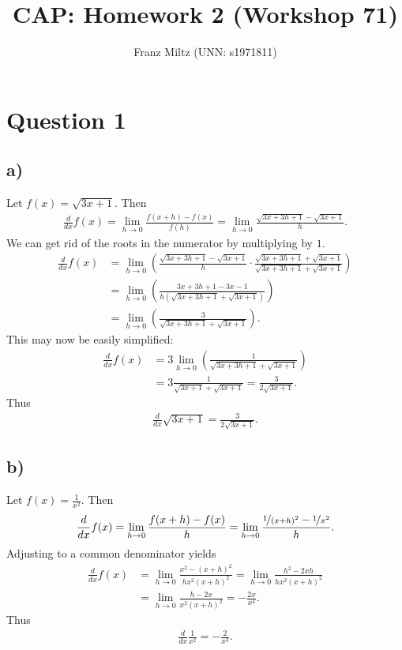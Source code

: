 \documentclass{article}
\title{CAP: Homework 2 (Workshop 71)}
\author{Franz Miltz (UNN: s1971811)}
\begin{document}
\maketitle
\section*{Question 1}
\subsection*{a)}
Let $f(x)=\sqrt{3x+1}$. Then
\begin{align*}
  \frac{d}{dx}f(x)=\lim_{h\to0}\frac{f(x+h)-f(x)}{f(h)}
  =\lim_{h\to0}\frac{\sqrt{3x+3h+1}-\sqrt{3x+1}}{h}.
\end{align*}
We can get rid of the roots in the numerator by multiplying by $1$.
\begin{align*}
  \frac{d}{dx}f(x) & =\lim_{h\to0}\left(\frac{\sqrt{3x+3h+1}-\sqrt{3x+1}}{h}\cdot\frac{\sqrt{3x+3h+1}+\sqrt{3x+1}}{\sqrt{3x+3h+1}+\sqrt{3x+1}}\right) \\
                   & =\lim_{h\to0}\left(\frac{3x+3h+1-3x-1}{h(\sqrt{3x+3h+1}+\sqrt{3x+1})}\right)                                                     \\
                   & =\lim_{h\to0}\left(\frac{3}{\sqrt{3x+3h+1}+\sqrt{3x+1}}\right).
\end{align*}
This may now be easily simplified:
\begin{align*}
  \frac{d}{dx}f(x) & = 3\lim_{h\to0}\left(\frac{1}{\sqrt{3x+3h+1}+\sqrt{3x+1}}\right) \\
                   & =3\frac{1}{\sqrt{3x+1}+\sqrt{3x+1}}=\frac{3}{2\sqrt{3x+1}}.
\end{align*}
Thus
\begin{align*}
  \frac{d}{dx}\sqrt{3x+1}=\frac{3}{2\sqrt{3x+1}}.
\end{align*}
\subsection*{b)}
Let $f(x)=\frac{1}{x^2}$. Then
\begin{align*}
  \frac{d}{dx}f(x)=\lim_{h\to0}\frac{f(x+h)-f(x)}{h}=\lim_{h\to0}\frac{\nicefrac{1}{(x+h)^2}-\nicefrac{1}{x^2}}{h}.
\end{align*}
Adjusting to a common denominator yields
\begin{align*}
  \frac{d}{dx}f(x) & =\lim_{h\to0}\frac{x^2-(x+h)^2}{hx^2(x+h)^2}
  =\lim_{h\to0}\frac{h^2-2xh}{hx^2(x+h)^2}                                 \\
                   & =\lim_{h\to0}\frac{h-2x}{x^2(x+h)^2}=-\frac{2x}{x^4}.
\end{align*}
Thus
\begin{align*}
  \frac{d}{dx}\frac{1}{x^2}=-\frac{2}{x^3}.
\end{align*}
\end{document}
